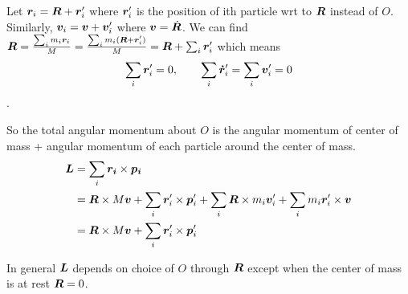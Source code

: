 \documentclass[12pt]{article}
\begin{document}
Let $\boldsymbol{r}_i = \boldsymbol{R} + \boldsymbol{r}_i'$ where $\boldsymbol{r}_i'$ is the position of ith particle wrt to $\boldsymbol{R}$ instead of $O$. Similarly, $\boldsymbol{v}_i = \boldsymbol{v} + \boldsymbol{v}_i'$ where $\boldsymbol{v} = \dot{\boldsymbol{R}}$.  We can find $\boldsymbol{R} = \frac{\sum_i m_i \boldsymbol{r}_i}{M} = \frac{\sum_i m_i (\boldsymbol{R} + \boldsymbol{r}_i')}{M} = \boldsymbol{R} + \sum_i \boldsymbol{r}_i' $ which means $$\sum_i  \boldsymbol{r}_i' = 0, \quad\quad \sum_i  \boldsymbol{\dot{r}}_i' = \sum_i  \boldsymbol{v}_i' = 0 $$.

So the total angular momentum about $O$ is the angular momentum of center of mass + angular momentum of each particle around the center of mass. 
$$\begin{aligned}
	\boldsymbol{L} &=  \sum_i \boldsymbol{r_i}\times \boldsymbol{p_i} \\
	       &=\boldsymbol{R}\times M \boldsymbol{v} + \sum_i \boldsymbol{r}_i'\times \boldsymbol{p}_i' + \sum_i \boldsymbol{R}\times m_i \boldsymbol{v}_i' + \sum_i m_i \boldsymbol{r}_i' \times \boldsymbol{v} \\
	       &=    \boldsymbol{R}\times M \boldsymbol{v} + \sum_i \boldsymbol{r}_i'\times \boldsymbol{p}_i'
\end{aligned}
$$

In general $\boldsymbol{L}$ depends on choice of $O$ through $\boldsymbol{R}$ except when the center of mass is at rest $\boldsymbol{R} = 0$.
\end{document}
